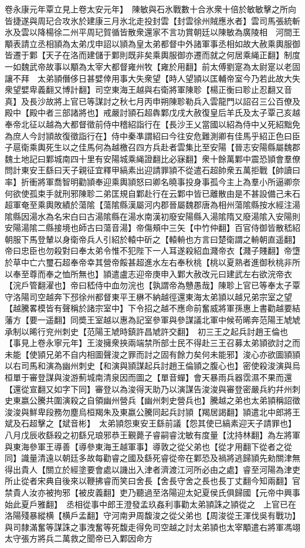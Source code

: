 卷永康元年覃立見上卷太安元年】　陳敏與石氷戰數十合氷衆十倍於敏敏擊之所向皆捷遂與周玘合攻氷於建康三月氷北走投封雲【封雲徐州賊應氷者】雲司馬張統斬氷及雲以降楊徐二州平周玘賀循皆散衆還家不言功賞朝廷以陳敏為廣陵相　河間王顒表請立丞相頴為太弟戊申詔以頴為皇太弟都督中外諸軍事丞相如故大赦乘輿服御皆遷于鄴【天子在洛而建儲于鄴則既非矣乘輿服御亦遷而就之何居乘䋲正翻】制度一如魏武帝故事以顒為太宰大都督雍州牧【雍於用翻】前太傅劉寔為太尉寔以老固讓不拜　太弟頴僭侈日甚嬖倖用事大失衆望【時人望頴以匡輔帝室今乃若此故大失衆望嬖卑義翻又博計翻】司空東海王越與右衛將軍陳聄【楊正衡曰聄止忍翻又音真】及長沙故將上官已等謀討之秋七月丙申朔陳聄勒兵入雲龍門以詔召三公百僚及殿中【殿中者三部諸將也】戒嚴討頴石超犇鄴戊戌大赦復皇后羊氏及太子覃己亥越奉帝北征以越為大都督徵前侍中稽紹詣行在【長沙王乂當國以紹為侍中乂死紹黜免為庶人今討頴故復徵詣行在】侍中秦凖謂紹曰今往安危難測卿有佳馬乎紹正色曰臣子扈衛乘輿死生以之佳馬何為越檄召四方兵赴者雲集比至安陽【晉志安陽縣屬魏郡魏土地記曰鄴城南四十里有安陽城乘䋲證翻比必寐翻】衆十餘萬鄴中震恐頴會羣僚問計東安王繇曰天子親征宜釋甲縞素出迎請罪頴不從遣石超帥衆五萬拒戰【帥讀曰率】折衝將軍喬智明勸頴奉迎乘輿頴怒曰卿名曉事投身事孤今主上為羣小所逼卿奈何欲使孤束手就刑邪陳聄二弟匡規自鄴赴行在云鄴中皆已離散由是不甚設備己未石超軍奄至乘輿敗績於蕩隂【蕩隂縣漢屬河内郡晉屬魏郡唐為相州蕩隂縣按水經注湯隂縣因湯水為名宋白曰古湯隂縣在湯水南漢初廢安陽縣入湯隂隋又廢湯隂入安陽則安陽湯隂二縣接境也師古曰蕩音湯】帝傷頰中三矢【中竹仲翻】百官侍御皆散嵇紹朝服下馬登輦以身衛帝兵人引紹於轅中斫之【轅輈也方言曰楚衛謂之輈朝直遥翻】帝曰忠臣也勿殺對曰奉太弟令惟不犯陛下一人耳遂殺紹血濺帝衣【濺子賤翻】帝墯於草中亡六璽石超奉帝幸其營帝餒甚超進水左右奉秋桃【桃以夏熟者進御秋桃非所以奉至尊而奉之恤所無也】頴遣盧志迎帝庚申入鄴大赦改元曰建武左右欲浣帝衣【浣戶管翻濯也】帝曰嵇侍中血勿浣也【孰謂帝為戇愚哉】陳聄上官已等奉太子覃守洛陽司空越奔下邳徐州都督東平王楙不納越徑還東海太弟頴以越兄弟宗室之望【越騰畧模皆有聲稱於諸宗室中】下令招之越不應命前奮威將軍孫惠上書勸越要結藩方【要一遥翻】同奬王室越以惠為記室參軍與參謀議北軍中候苟晞奔范陽王虓虓承制以晞行兖州刺史【范陽王虓時鎮許昌虓許交翻】　初三王之起兵討趙王倫也【事見上卷永寧元年】王浚擁衆挾兩端禁所部士民不得赴三王召募太弟頴欲討之而未能【使頴兄弟不自内相圖聲浚之罪而討之固有餘力矣何未能邪】浚心亦欲圖頴頴以右司馬和演為幽州刺史【和演與頴謀起兵討趙王倫頴之腹心也】密使殺浚演與烏桓單于審登謀與浚游薊城南清泉因而圖之【單音蟬】會天暴雨兵器霑濕不果而還【還從宣翻又如字下同】審登以為浚得天助乃以演謀告浚浚與審登密嚴兵約幷州刺史東嬴公騰共圍演殺之自領幽州營兵【幽州刺史營兵也】騰越之弟也太弟頴稱詔徵浚浚與鮮卑段務勿塵烏桓羯朱及東嬴公騰同起兵討頴【羯居謁翻】頴遣北中郎將王斌及石超擊之【斌音彬】　太弟頴怨東安王繇前議【怨其使已縞素迎天子請罪也】八月戊辰收繇殺之初繇兄琅邪恭王覲薨子睿嗣睿沈敏有度量【沈持林翻】為左將軍與東海參軍王導善【導參東海王越軍事】導敦之從父弟也【從才用翻下從者之從同】識量清遠以朝廷多故每勸睿之國及繇死睿從帝在鄴恐及禍將逃歸頴先勑關津無得出貴人【關立於經塗要會處以譏出入津者濟渡江河所必由之處】睿至河陽為津吏所止從者宋典自後來以鞭拂睿而笑曰舍長【舍長守舍之長也長丁丈翻今知兩翻】官禁貴人汝亦被拘邪【被皮義翻】吏乃聽過至洛陽迎太妃夏侯氏俱歸國【元帝中興事始此夏戶雅翻】　丞相從事中郎王澄發孟玖姦利事勸太弟頴誅之頴從之　上官已在洛陽殘暴縱横【横戶孟翻】守河南尹周馥浚之從父弟也【周浚從王渾伐吳有戰功】與司隸滿奮等謀誅之事洩奮等死馥走得免司空越之討太弟頴也太宰顒遣右將軍馮翊太守張方將兵二萬救之聞帝已入鄴因命方